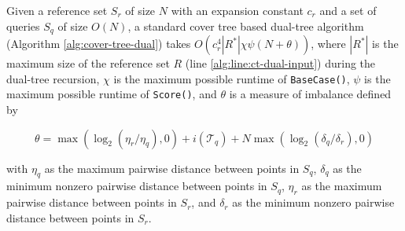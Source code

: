 \begin{thm}
\label{thm:ct-runtime}
Given a reference set $S_r$ of size $N$ with an expansion constant $c_r$ and a
set of queries $S_q$ of size $O(N)$, a standard cover tree based dual-tree
algorithm (Algorithm \ref{alg:cover-tree-dual}) takes $O(c_r^4 | R^* | \chi
\psi (N + \theta))$, where $ | R^* | $ is the maximum size of the reference set $R$ (line
\ref{alg:line:ct-dual-input}) during the dual-tree recursion, $\chi$ is
the maximum possible runtime of \texttt{BaseCase()}, $\psi$ is the maximum
possible runtime of \texttt{Score()}, and $\theta$ is a measure of imbalance
defined by

\begin{equation}
\theta = \max(\log_2(\eta_r / \eta_q), 0) + i(\mathscr{T}_q) + N
\max(\log_2(\delta_q / \delta_r), 0)
\end{equation}

\noindent with $\eta_q$ as the maximum pairwise distance between points in
$S_q$, $\delta_q$ as the minimum nonzero pairwise distance between points in
$S_q$, $\eta_r$ as the maximum pairwise distance between points in $S_r$, and
$\delta_r$ as the minimum nonzero pairwise distance between points in $S_r$.
\end{thm}

